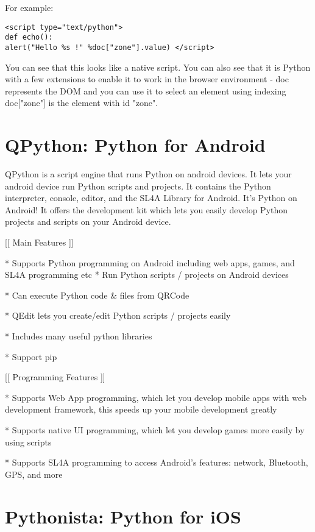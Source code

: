 For example:

\begin{lstlisting}
<script type="text/python">
def echo():
alert("Hello %s !" %doc["zone"].value) </script>
\end{lstlisting}

You can see that this looks like a native script. You can also see that it is Python with a few extensions to enable it to work in the browser environment - doc represents the DOM and you can use it to select an element using indexing doc["zone"] is the element with id "zone". 








\newpage
\section{QPython: Python for Android}

QPython is a script engine that runs Python on android devices. It lets your android device run Python scripts and projects. It contains the Python interpreter, console, editor, and the SL4A Library for Android. It’s Python on Android! It offers the development kit which lets you easily develop Python projects and scripts on your Android device.


[[ Main Features ]] 

* Supports Python programming on Android including web apps, games, and SL4A programming etc * Run Python scripts / projects on Android devices 

* Can execute Python code \& files from QRCode 

* QEdit lets you create/edit Python scripts / projects easily 

* Includes many useful python libraries 

* Support pip 

[[ Programming Features ]] 

* Supports Web App programming, which let you develop mobile apps with web development framework, this speeds up your mobile development greatly 

* Supports native UI programming, which let you develop games more easily by using scripts 

* Supports SL4A programming to access Android’s features: network, Bluetooth, GPS, and more



\newpage
\section{Pythonista: Python for iOS}

